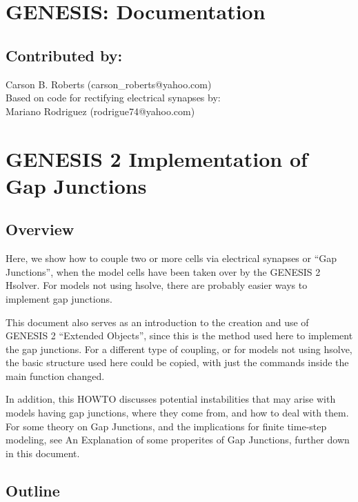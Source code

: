 \documentclass[12pt]{article}
\begin{document}
\section*{GENESIS: Documentation}

\subsection*{Contributed by:}

Carson B. Roberts (carson\_roberts@yahoo.com) \\
Based on code for rectifying electrical synapses by: \\
Mariano Rodriguez (rodrigue74@yahoo.com)

\section*{GENESIS 2 Implementation of Gap Junctions}

\subsection*{Overview}

Here, we show how to couple two or more cells via electrical synapses or ``Gap Junctions'', when the model cells have been taken over by the GENESIS 2 Hsolver. For models not using hsolve, there are probably easier ways to implement gap junctions.

This document also serves as an introduction to the creation and use of GENESIS 2 ``Extended Objects'', since this is the method used here to implement the gap junctions. For a different type of coupling, or for models not using hsolve, the basic structure used here could be copied, with just the commands inside the main function changed.

In addition, this HOWTO discusses potential instabilities that may arise with models having gap junctions, where they come from, and how to deal with them. For some theory on Gap Junctions, and the implications for finite time-step modeling, see An Explanation of some properites of Gap Junctions, further down in this document.

\subsection*{Outline}
\end{document}
